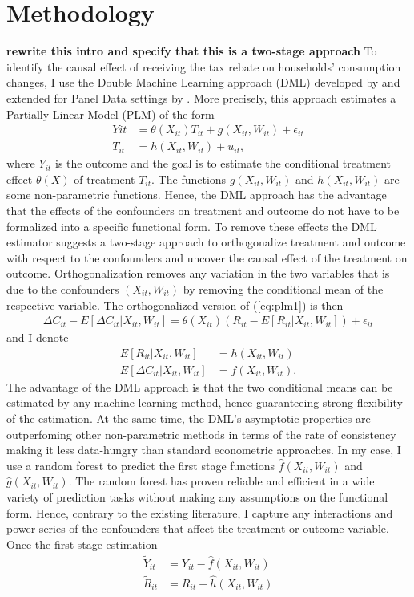 \section*{Methodology}
\textbf{rewrite this intro and specify that this is a two-stage approach}
To identify the causal effect of receiving the tax rebate on households' consumption changes, I use the Double Machine Learning approach (DML) developed by \cite{DML2017} and extended for Panel Data settings by \cite{PanelDML}. More precisely, this approach estimates a Partially Linear Model (PLM) of the form
\begin{align}
    Y{it}&=\theta(X_{it})T_{it}+g(X_{it}, W_{it})+\epsilon_{it} \label{eq:plm1}\\
    T_{it}&=h(X_{it}, W_{it})+u_{it}, \label{eq:plm2}
\end{align}
where $Y_{it}$ is the outcome and the goal is to estimate the conditional treatment effect $\theta(X)$ of treatment $T_{it}$. The functions $g(X_{it}, W_{it})$ and $h(X_{it}, W_{it})$ are some non-parametric functions. Hence, the DML approach has the advantage that the effects of the confounders on treatment and outcome do not have to be formalized into a specific functional form. To remove these effects the DML estimator suggests a two-stage approach to orthogonalize treatment and outcome with respect to the confounders and uncover the causal effect of the treatment on outcome. Orthogonalization removes any variation in the two variables that is due to the confounders $(X_{it}, W_{it})$ by removing the conditional mean of the respective variable. The orthogonalized version of (\ref{eq:plm1}) is then
\begin{align}
    \Delta C_{it}-E[\Delta C_{it}|X_{it}, W_{it}]=\theta(X_{it})(R_{it}-E[R_{it}|X_{it}, W_{it}])+\epsilon_{it}
\end{align}
and I denote
\begin{align}
    E[R_{it}|X_{it}, W_{it}]&=h(X_{it}, W_{it}) \\
    E[\Delta C_{it}|X_{it}, W_{it}]&=f(X_{it}, W_{it}).
\end{align}
The advantage of the DML approach is that the two conditional means can be estimated by any machine learning method, hence guaranteeing strong flexibility of the estimation. At the same time, the DML's asymptotic properties are outperfoming other non-parametric methods in terms of the rate of consistency making it less data-hungry than standard econometric approaches. In my case, I use a random forest to predict the first stage functions $\hat{f}(X_{it}, W_{it})$ and $\hat{g}(X_{it}, W_{it})$. The random forest has proven reliable and efficient in a wide variety of prediction tasks without making any assumptions on the functional form. Hence, contrary to the existing literature, I capture any interactions and power series of the confounders that affect the treatment or outcome variable. \\ 
Once the first stage estimation 
\begin{align}
    \tilde{Y}_{it}&=Y_{it}-\hat{f}(X_{it}, W_{it})\\
    \tilde{R}_{it}&=R_{it}-\hat{h}(X_{it}, W_{it})
\end{align}

